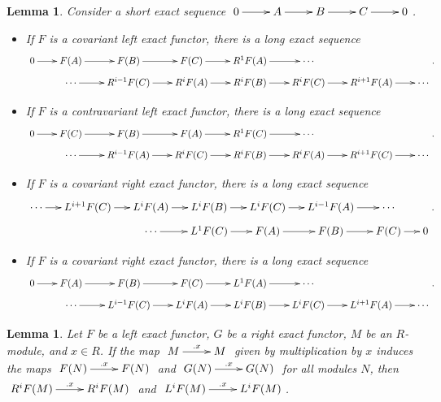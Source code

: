 \documentclass[11pt]{book}
\newtheorem{lemma}[theorem]{Lemma}
\numberwithin{equation}{section}
\numberwithin{theorem}{chapter}
\theoremstyle{definition}
\newtheorem*{basic properties}{Basic Properties}
\newtheorem*{Important Remark}{Important Remark}
\theoremstyle{remark}
\begin{document}
\begin{lemma}\label{long exact sequence}
	Consider a short exact sequence $\xymatrix{0 \ar[r] & A \ar[r] & B \ar[r] & C \ar[r] & 0}$.
	\begin{itemize}
		\item If $F$ is a covariant left exact functor, there is a long exact sequence
	$$\xymatrix@R=2mm@C=7mm{0 \ar[r] & F(A) \ar[r] & F(B) \ar[r] & F(C) \ar[r] & R^1F(A) \ar[r] & \cdots \\
		&\cdots \ar[r] & R^{i-1}F(C) \ar[r] & R^iF(A) \ar[r] & R^iF(B) \ar[r] & R^iF(C) \ar[r] & R^{i+1}F(A) \ar[r] & \cdots}.$$
		
	
		\item If $F$ is a contravariant left exact functor, there is a long exact sequence
		$$\xymatrix@R=2mm@C=7mm{0 \ar[r] & F(C) \ar[r] & F(B) \ar[r] & F(A) \ar[r] & R^1F(C) \ar[r] & \cdots \\
		&\cdots \ar[r] & R^{i-1}F(A) \ar[r] & R^iF(C) \ar[r] & R^iF(B) \ar[r] & R^iF(A) \ar[r] & R^{i+1}F(C) \ar[r] & \cdots}.$$
		
		
		\item If $F$ is a covariant right exact functor, there is a long exact sequence
		$$\xymatrix@R=2mm@C=5mm{\cdots \ar[r] & L^{i+1}F(C) \ar[r] & L^iF(A) \ar[r] & L^iF(B) \ar[r] & L^iF(C) \ar[r] & L^{i-1}F(A) \ar[r] & \cdots \\
		&& \cdots \ar[r] & L^1F(C) \ar[r] & F(A) \ar[r] & F(B) \ar[r] & F(C) \ar[r] & 0}.$$
		
		\item If $F$ is a covariant right exact functor, there is a long exact sequence
		$$\xymatrix@R=2mm@C=7mm{0 \ar[r] & F(A) \ar[r] & F(B) \ar[r] & F(C) \ar[r] & L^1F(A) \ar[r] & \cdots \\
		&\cdots \ar[r] & L^{i-1}F(C) \ar[r] & L^iF(A) \ar[r] & L^iF(B) \ar[r] & L^iF(C) \ar[r] & L^{i+1}F(A) \ar[r] & \cdots}.$$
	\end{itemize}
\end{lemma}


\begin{lemma}
	Let $F$ be a left exact functor, $G$ be a right exact functor, $M$ be an $R$-module, and $x \in R$. If the map $\xymatrix{M \ar[r]^-{.x} & M}$ given by multiplication by $x$ induces the maps $\xymatrix{F(N)\ar[r]^-{.x}& F(N)}$ and $\xymatrix{G(N) \ar[r]^-{.x} & G(N)}$ for all modules $N$, then $\xymatrix{R^iF(M) \ar[r]^-{.x} & R^i F(M)}$ and $\xymatrix{L^iF(M) \ar[r]^-{.x} & L^iF(M)}$.
\end{lemma}
\end{document}
